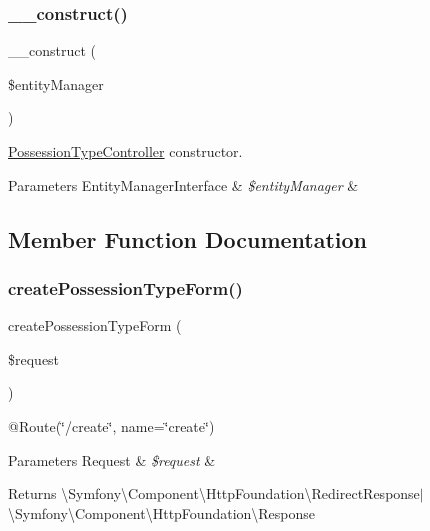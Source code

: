 \subsubsection{\texorpdfstring{\_\_construct()}{\_\_construct()}}
{\footnotesize\ttfamily \+\_\+\+\_\+construct (\begin{DoxyParamCaption}\item[{Entity\+Manager\+Interface}]{\$entity\+Manager }\end{DoxyParamCaption})}

\mbox{\hyperlink{class_app_1_1_controller_1_1_possession_type_controller}{Possession\+Type\+Controller}} constructor. 
\begin{DoxyParams}[1]{Parameters}
Entity\+Manager\+Interface & {\em \$entity\+Manager} & \\
\hline
\end{DoxyParams}


\subsection{Member Function Documentation}
\mbox{\label{class_app_1_1_controller_1_1_possession_type_controller_ac7e770cc60caacc424e7996f3fb2946a}} 
\subsubsection{\texorpdfstring{createPossessionTypeForm()}{createPossessionTypeForm()}}
{\footnotesize\ttfamily create\+Possession\+Type\+Form (\begin{DoxyParamCaption}\item[{Request}]{\$request }\end{DoxyParamCaption})}

@\+Route(\char`\"{}/create\char`\"{}, name=\char`\"{}create\char`\"{}) 
\begin{DoxyParams}[1]{Parameters}
Request & {\em \$request} & \\
\hline
\end{DoxyParams}
\begin{DoxyReturn}{Returns}
\textbackslash{}\+Symfony\textbackslash{}\+Component\textbackslash{}\+Http\+Foundation\textbackslash{}\+Redirect\+Response$\vert$\textbackslash{}\+Symfony\textbackslash{}\+Component\textbackslash{}\+Http\+Foundation\textbackslash{}\+Response 
\end{DoxyReturn}
\mbox{\label{class_app_1_1_controller_1_1_possession_type_controller_a2ad87a191efa444fffba6372f560bb95}} 
